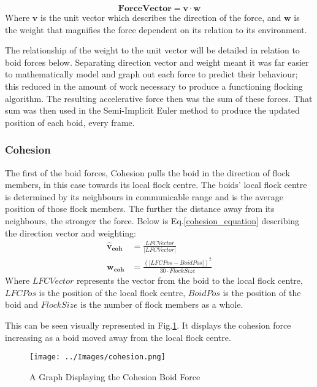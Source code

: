\begin{equation}
\boldsymbol{Force Vector} = \boldsymbol{v} \cdot \boldsymbol{w}
\label{forcevector_equation}
\end{equation}
Where $\boldsymbol{v}$ is the unit vector which describes the direction of the force, and $\boldsymbol{w}$ is the weight that magnifies the force dependent on its relation to its environment.

The relationship of the weight to the unit vector will be detailed in relation to boid forces below. Separating direction vector and weight meant it was far easier to mathematically model and graph out each force to predict their behaviour; this reduced in the amount of work necessary to produce a functioning flocking algorithm. The resulting accelerative force then was the sum of these forces. That sum was then used in the Semi-Implicit Euler method to produce the updated position of each boid, every frame.


\subsubsection{Cohesion} 
The first of the boid forces, Cohesion pulls the boid in the direction of flock members, in this case towards its local flock centre. The boids' local flock centre is determined by its neighbours in communicable range and is the average position of those flock members. The further the distance away from its neighbours, the stronger the force. Below is Eq.\ref{cohesion_equation} describing the direction vector and weighting:
\begin{equation}
\begin{split}
	\boldsymbol{\hat{v}_{coh}} &= \frac{ LFCVector} {|LFCVector|} \\
	\boldsymbol{w_{coh}} &= \frac{(|LFCPos - BoidPos|)^2} {30 \cdot FlockSize}
\end{split}
\label{cohesion_equation}
\end{equation}
Where $LFCVector$ represents the vector from the boid to the local flock centre, $LFCPos$ is the position of the local flock centre, $BoidPos$ is the position of the boid and $FlockSize$ is the number of flock members as a whole.

This can be seen visually represented in Fig.\ref{fig:cohesion}. It displays the cohesion force increasing as a boid moved away from the local flock centre.
\begin{figure}[H]
	\texttt{[image: ../Images/cohesion.png]}
	\caption{A Graph Displaying the Cohesion Boid Force}
	\label{fig:cohesion}
\end{figure}


